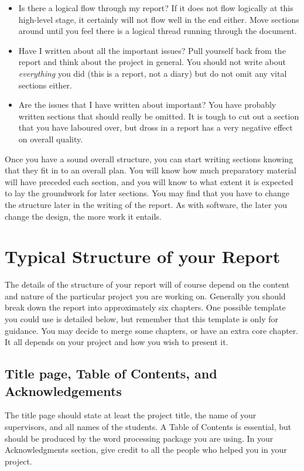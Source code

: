 \documentclass[]{final_report}
\begin{document}
\begin{itemize}
\item Is there a logical flow through my report? If it does not flow logically at this high-level stage, it certainly will not flow well in the end either. Move sections around until you feel there is a logical thread running through the document.
\item Have I written about all the important issues? Pull yourself back from the report and think about the project in general. You should not write about {\sl everything} you did (this is a report, not a diary) but do not omit any vital sections either.
\item Are the issues that I have written about important? You have probably written sections that should really be omitted. It is tough to cut out a section that you have laboured over, but dross in a report has a very negative effect on overall quality.
\end{itemize}

Once you have a sound overall structure, you can start writing sections knowing that they fit in to an overall plan. You will know how much preparatory material will have preceded each section, and you will know to what extent it is expected to lay the groundwork for later sections. You may find that you have to change the structure later in the writing of the report. As with software, the later you change the design, the more work it entails.


\section{Typical Structure of your Report}

The details of the structure of your report will of course depend on the content and nature of the particular project you are working on. Generally you should break down the report into approximately six chapters. One possible template you could use is detailed below, but remember that this template is only for guidance. You may decide to merge some chapters, or have an extra core chapter. It all depends on your project and how you wish to present it.

\subsection{Title page, Table of Contents, and Acknowledgements}

The title page should state at least the project title, the name of your supervisors, and all names of the students. A Table of Contents is essential, but should be produced by the word processing package you are using. In your Acknowledgments section, give credit to all the people who helped you in your project.
\end{document}
